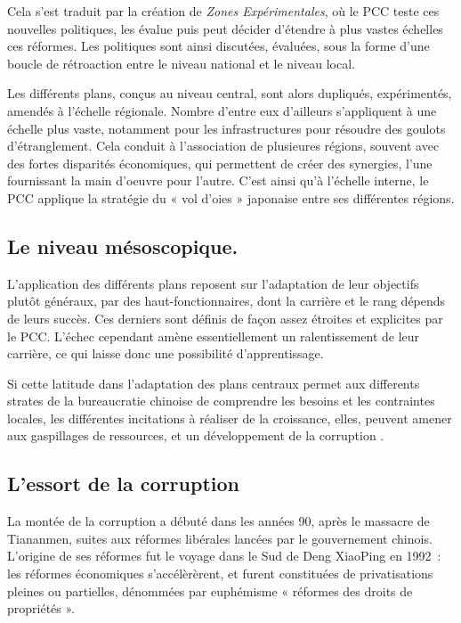 \documentclass[a4paper]{article}
\begin{document}
Cela s’est traduit par la création de \textit{Zones Expérimentales}, où le PCC teste ces nouvelles politiques, les évalue puis peut décider d’étendre à plus vastes échelles ces réformes. Les politiques sont ainsi discutées, évaluées, sous la forme d’une boucle de rétroaction entre le niveau national et le niveau local.

Les différents plans, conçus au niveau central, sont alors dupliqués, expérimentés, amendés à l’échelle régionale. Nombre d’entre eux d’ailleurs s’ap\-pli\-quent à une échelle plus vaste, notamment pour les infrastructures pour résoudre des goulots d’étranglement. Cela conduit à l’association de plusieures régions, souvent avec des fortes disparités économiques, qui permettent de créer des synergies, l’une fournissant la main d’oeuvre pour l’autre. C’est ainsi qu’à l’échelle interne, le PCC applique la stratégie du « vol d’oies » japonaise entre ses différentes régions.

\subsection{Le niveau mésoscopique.}
\label{sec:orgc8b3031}
L’application des différents plans reposent sur l’adaptation de leur objectifs plutôt généraux, par des haut-fonctionnaires, dont la carrière et le rang dépends de leurs succès. Ces derniers sont définis de façon assez étroites et explicites par le PCC. L’échec cependant amène essentiellement un ralentissement de leur carrière, ce qui laisse donc une possibilité d’apprentissage.

Si cette latitude dans l’adaptation des plans centraux permet aux differents strates de la bureaucratie chinoise de comprendre les besoins et les contraintes locales, les différentes incitations à réaliser de la croissance, elles, peuvent amener aux gaspillages de ressources, et un développement de la corruption \cite{ang16_how_china}.

\subsection{L’essort de la corruption}
\label{sec:orga8aaf5f}
La montée de la corruption a débuté dans les années 90, après le massacre de Tiananmen, suites aux réformes libérales lancées par le gouvernement chinois. L’origine de ses réformes fut le voyage dans le Sud de Deng XiaoPing en 1992~: les réformes économiques s'accélèrèrent, et furent constituées de privatisations pleines ou partielles, dénommées par euphémisme « réformes des droits de propriétés ».
\end{document}
